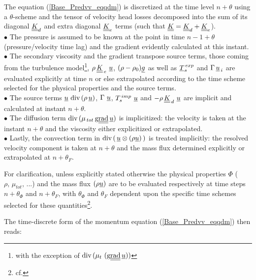 The equation (\ref{Base_Predvv_eqqdm}) is discretized at the time level
$n+\theta$ using a $\theta$-scheme and the tensor of velocity head losses
decomposed into the sum of its diagonal $\underline{\underline{K}}_{d}$ and extra diagonal $\underline{\underline{K}}_{e}$ terms (such that
 $\underline{\underline{K}}=\underline{\underline{K}}_{d}+\underline{\underline{K}}_{e}$).\\
$\bullet$ The pressure is assumed to be known at the point in time $n-1+\theta$
(pressure/velocity time lag) and the gradient evidently calculated at this instant.\\
$\bullet$ The secondary viscosity and the gradient transpose source terms,
those coming from the turbulence model\footnote{with the exception of $\text{div}\, (\mu_t\ (\text{g}\underline{\underline{{\text{rad}}}}\,
\underline{u}))$}, $\rho\,\underline{\underline{K}}_{\,e}\ \underline{u}$, $(\rho -\rho_0)
\underline{g}$ as well as $\underline{T}_{s}^{\,exp}$ and
$\Gamma\,\underline{u}_{\,i}$ are evaluated explicitly at time $n$ or else
extrapolated according to the time scheme selected for the physical properties and the
source terms.\\
$\bullet$ The source terms $\underline{u}\,\,\text{div}\, (\rho\,\underline{u})$,
$\Gamma\,\,\underline{u}$, $T_{s}^{\,imp}\,\,\underline{u}$ and
$-\rho\,\underline{\underline{K}}_{\,d}\,\,\underline{u}$ are implicit and calculated at
instant $n+\theta$.\\
$\bullet$ The diffusion term  $\text{div}\, (\mu_{\,tot}\,\text{g}\underline{\underline{{\text{rad}}}}\, \underline{u})$ is implicitized: the velocity is taken at the instant $n+\theta$ and the viscosity either explicitized or extrapolated.\\
$\bullet$ Lastly, the convection term in $\text{div}\,(\,\underline{u} \otimes
(\rho\underline{u})\,)$ is treated implicitly: the resolved velocity
component is
taken at $n+\theta$ and the mass flux determined explicitly or extrapolated
at
$n+\theta_F$.

For clarification, unless explicitly stated otherwise the physical properties
$\Phi$ ($\rho,\,\mu_{tot},\,...$) and the mass flux $(\rho\underline{u})$
are  to be evaluated respectively at time steps $n+\theta_\Phi$ and
$n+\theta_F$, with $\theta_\Phi$ and $\theta_F$ dependent upon the specific
time schemes selected for these quantities\footnote{cf. }.

The time-discrete form of the momentum equation (\ref{Base_Predvv_eqqdm}) then reads:


